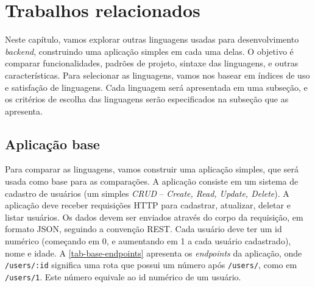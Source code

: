 
\chapter{Trabalhos relacionados}\label{chapter:trabalhos-relacionados}

Neste capítulo, vamos explorar outras linguagens usadas para desenvolvimento \textit{backend},
construindo uma aplicação simples em cada uma delas. O objetivo é comparar funcionalidades,
padrões de projeto, sintaxe das linguagens, e outras características. Para selecionar
as linguagens, vamos nos basear em índices de uso e satisfação de linguagens. Cada
linguagem será apresentada em uma subseção, e os critérios de escolha das linguagens
serão especificados na subseção que as apresenta.

\section{Aplicação base}\label{sec:aplicacao-base}

Para comparar as linguagens, vamos construir uma aplicação simples, que será usada
como base para as comparações. A aplicação consiste em um sistema de cadastro de
usuários (um simples \textit{CRUD} -- \textit{Create, Read, Update, Delete}). A
aplicação deve receber requisições HTTP para cadastrar, atualizar, deletar e listar
usuários. Os dados devem ser enviados através do corpo da requisição, em formato
JSON, seguindo a convenção REST. Cada usuário deve ter um id numérico (começando
em 0, e aumentando em 1 a cada usuário cadastrado), nome e idade. A
\autoref{tab-base-endpoints} apresenta os \textit{endpoints} da aplicação, onde
\texttt{/users/:id} significa uma rota que possui um número após \texttt{/users/},
como em \texttt{/users/1}. Este número equivale ao id numérico de um usuário.


